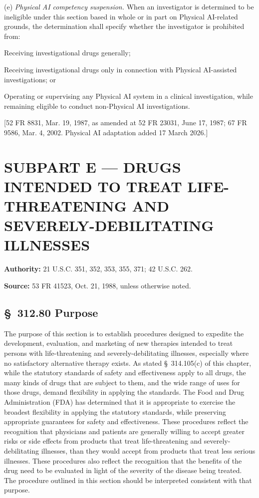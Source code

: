 \documentclass[11pt]{article}
\begin{document}
(e) \textit{Physical AI competency suspension.} When an investigator is determined to be ineligible under this section based in whole or in part on Physical AI-related grounds, the determination shall specify whether the investigator is prohibited from:

\begin{description}[leftmargin=0.8cm,style=sameline]
\item[(i)] Receiving investigational drugs generally;
\item[(ii)] Receiving investigational drugs only in connection with Physical AI-assisted investigations; or
\item[(iii)] Operating or supervising any Physical AI system in a clinical investigation, while remaining eligible to conduct non-Physical AI investigations.
\end{description}

[52 FR 8831, Mar. 19, 1987, as amended at 52 FR 23031, June 17, 1987; 67 FR 9586, Mar. 4, 2002. Physical AI adaptation added 17 March 2026.]

\clearpage

\section{SUBPART E --- DRUGS INTENDED TO TREAT LIFE-THREATENING AND SEVERELY-DEBILITATING ILLNESSES}

\textbf{Authority:} 21 U.S.C. 351, 352, 353, 355, 371; 42 U.S.C. 262.

\textbf{Source:} 53 FR 41523, Oct. 21, 1988, unless otherwise noted.

\subsection{\S~312.80 Purpose}

The purpose of this section is to establish procedures designed to expedite the development, evaluation, and marketing of new therapies intended to treat persons with life-threatening and severely-debilitating illnesses, especially where no satisfactory alternative therapy exists. As stated \S~314.105(c) of this chapter, while the statutory standards of safety and effectiveness apply to all drugs, the many kinds of drugs that are subject to them, and the wide range of uses for those drugs, demand flexibility in applying the standards. The Food and Drug Administration (FDA) has determined that it is appropriate to exercise the broadest flexibility in applying the statutory standards, while preserving appropriate guarantees for safety and effectiveness. These procedures reflect the recognition that physicians and patients are generally willing to accept greater risks or side effects from products that treat life-threatening and severely-debilitating illnesses, than they would accept from products that treat less serious illnesses. These procedures also reflect the recognition that the benefits of the drug need to be evaluated in light of the severity of the disease being treated. The procedure outlined in this section should be interpreted consistent with that purpose.
\end{document}
